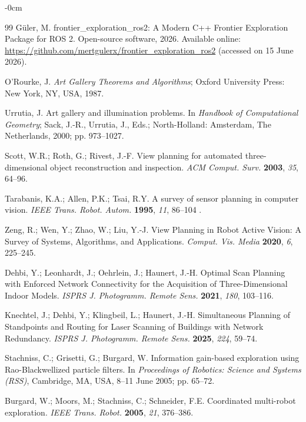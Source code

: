 \documentclass[sensors,article,submit,pdftex,moreauthors]{Definitions/mdpi}
\providecommand{\DIFadd}[1]{{\protect\color{blue} \sf #1}} %
\providecommand{\DIFaddbegin}{} %
\providecommand{\DIFaddend}{} %
\begin{document}
\begin{adjustwidth}{-\extralength}{0cm}
\begin{thebibliography}{99}
G\"uler, M. frontier\_exploration\_ros2: A Modern C++ Frontier Exploration Package for ROS 2. Open-source software, 2026. Available online: \url{https://github.com/mertgulerx/frontier_exploration_ros2} (accessed on 15 June 2026).

O'Rourke, J. \textit{Art Gallery Theorems and Algorithms}; Oxford University Press: New York, NY, USA, 1987.

Urrutia, J. Art gallery and illumination problems. In \textit{Handbook of Computational Geometry}; Sack, J.-R., Urrutia, J., Eds.; North-Holland: Amsterdam, The Netherlands, 2000; pp. 973--1027.

Scott, W.R.; Roth, G.; Rivest, J.-F. View planning for automated three-dimensional object reconstruction and inspection. \textit{ACM Comput. Surv.} \textbf{2003}, \textit{35}, 64--96.

Tarabanis, K.A.; Allen, P.K.; Tsai, R.Y. A survey of sensor planning in computer vision. \textit{IEEE Trans. Robot. Autom.} \textbf{1995}, \textit{11}, 86--104\DIFaddbegin \DIFadd{.
}

\DIFadd{Zeng, R.; Wen, Y.; Zhao, W.; Liu, Y.-J. View Planning in Robot Active Vision: A Survey of Systems, Algorithms, and Applications. \textit{Comput. Vis. Media} \textbf{2020}, \textit{6}, 225--245.
}

\DIFadd{Dehbi, Y.; Leonhardt, J.; Oehrlein, J.; Haunert, J.-H. Optimal Scan Planning with Enforced Network Connectivity for the Acquisition of Three-Dimensional Indoor Models. \textit{ISPRS J. Photogramm. Remote Sens.} \textbf{2021}, \textit{180}, 103--116.
}

\DIFadd{Knechtel, J.; Dehbi, Y.; Klingbeil, L.; Haunert, J.-H. Simultaneous Planning of Standpoints and Routing for Laser Scanning of Buildings with Network Redundancy. \textit{ISPRS J. Photogramm. Remote Sens.} \textbf{2025}, \textit{224}, 59--74}\DIFaddend .

Stachniss, C.; Grisetti, G.; Burgard, W. Information gain-based exploration using Rao-Blackwellized particle filters. In \textit{Proceedings of Robotics: Science and Systems (RSS)}, Cambridge, MA, USA, 8--11 June 2005; pp. 65--72.

Burgard, W.; Moors, M.; Stachniss, C.; Schneider, F.E. Coordinated multi-robot exploration. \textit{IEEE Trans. Robot.} \textbf{2005}, \textit{21}, 376--386.


\end{thebibliography}
\end{adjustwidth}
\end{document}
